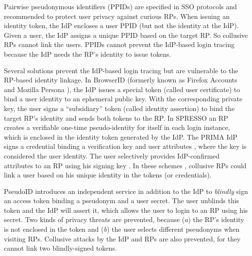 Pairwise pseudonymous identifiers (PPIDs) are specified in SSO protocols \cite{OpenIDConnect, SAMLIdentifier} and recommended \cite{NIST2017draft}
to protect user privacy against curious RPs.
When issuing an identity token,
        the IdP encloses a user PPID (but not the identity at the IdP).
Given a user, the IdP assigns a unique PPID based on the target RP.
So collusive RPs cannot link the users.
PPIDs cannot prevent the IdP-based login tracing because the IdP needs the RP's identity to issue tokens.



Several solutions prevent the IdP-based login tracing but are vulnerable to the RP-based identity linkage.
In BrowserID \cite{BrowserID} (formerly known as Firefox Accounts \cite{FirefoxAccount} and Mozilla Persona \cite{persona}), the IdP %
issues a special token (called user certificate) to bind a user identity to an ephemeral public key. With the corresponding private key, the user signs a ``subsidiary'' token (called identity assertion) to bind the target RP's identity and sends both tokens to the RP.
In SPRESSO \cite{SPRESSO} an RP creates a verifiable one-time pseudo-identity for itself in each login instance, which is enclosed in the identity token generated by the IdP. %
The PRIMA IdP signs a credential
 binding a verification key and user attributes \cite{prima}, where the key is considered the user identity.
The user selectively provides IdP-confirmed attributes to an RP using his signing key \cite{Oblivion}.
In these schemes \cite{BrowserID,SPRESSO,prima}, collusive RPs could link a user based on his unique identity in the tokens (or credentials).


PseudoID \cite{PseudoID} introduces an independent service in addition to the IdP to \emph{blindly} sign an access token binding a pseudonym and a user secret.
The user unblinds this token and the IdP will assert it,
    which allows the user to login to an RP using his secret.
Two kinds of privacy threats are prevented, because (\emph{a}) the RP's identity is not enclosed in the token
    and (\emph{b}) the user selects different pseudonyms when visiting RPs.
Collusive attacks by the IdP and RPs are also prevented,
    for they cannot link two blindly-signed tokens.



